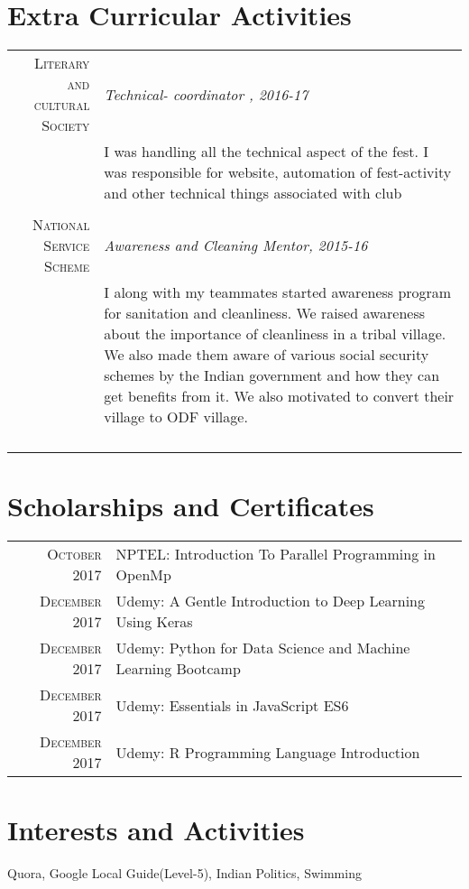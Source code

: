 \documentclass[a4paper,10pt]{article}
\begin{document}
\section{Extra Curricular Activities}
\begin{tabular}{r|p{11cm}}

\textsc{Literary and cultural Society} & \emph{Technical- coordinator , 2016-17}\\&\footnotesize{I was handling all the technical aspect of the fest. I was responsible for website, automation
of fest-activity and other technical things associated with club }\\ \\
\textsc{National Service Scheme} & \emph{Awareness and Cleaning Mentor, 2015-16}\\&\footnotesize{I along with my teammates started awareness program for sanitation and cleanliness. We raised awareness about the importance of cleanliness in a tribal village. We also made them aware of various social security schemes by the Indian government and how they can get benefits from it. We also motivated to convert their village to ODF village.}\\ \\
\\ \\

\multicolumn{2}{c}{}
\end{tabular}

\section{Scholarships and Certificates}
\begin{tabular}{rl}
 \textsc{October} 2017 & NPTEL: Introduction To Parallel Programming in OpenMp \normalsize\\
 \textsc{December} 2017 & Udemy: A Gentle Introduction to Deep Learning Using Keras \normalsize\\
 \textsc{December} 2017 & Udemy:  Python for Data Science and Machine Learning Bootcamp  \normalsize \\
 \textsc{December} 2017 & Udemy: Essentials in JavaScript ES6 \normalsize\\
 \textsc{December} 2017 & Udemy: R Programming Language Introduction  \normalsize\\

\end{tabular}


\section{Interests and Activities}
Quora, Google Local Guide(Level-5), Indian Politics, Swimming
\\




\end{document}

